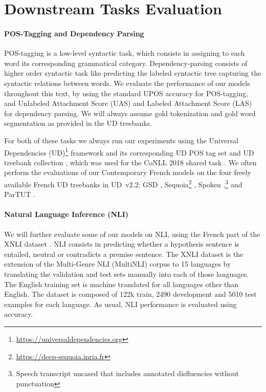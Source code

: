 \section{Downstream Tasks Evaluation}\label{MethodEVAL}

\paragraph{POS-Tagging and Dependency Parsing} POS-tagging is a low-level syntactic task, which consists in assigning to each word its corresponding grammatical category. Dependency-parsing consists of higher order syntactic task like predicting the labeled syntactic tree capturing the syntactic relations between words. We evaluate the performance of our models throughout this text, by using the standard UPOS accuracy for POS-tagging, and Unlabeled Attachment Score (UAS) and Labeled Attachment Score (LAS) for dependency parsing. We will always assume gold tokenization and gold word segmentation as provided in the UD treebanks.

For both of these tasks we always run our experiments using the Universal Dependencies (UD)\footnote{\url{https://universaldependencies.org}} framework and its corresponding UD POS tag set \citep{petrov-etal-2012-universal} and UD treebank collection \citep{nivre-etal-2018-universal}, which was used for the CoNLL 2018 shared task \citep{seker-etal-2018-universal}. We often perform the evaluations of our Contemporary French models on the four freely available French UD treebanks in UD~v2.2: GSD \citep{mcdonald-etal-2013-universal}, Sequoia\footnote{\url{https://deep-sequoia.inria.fr}} \citep{candito-seddah-2012-le,candito-etal-2014-deep}, Spoken \citep{lacheret-etal-2014-rhapsodie,bawden-etal-2014-correcting},\footnote{Speech transcript uncased that includes annotated disfluencies without punctuation} and ParTUT \citep{sanguinetti-Bosco-2015-parttut}.

\paragraph{Natural Language Inference (NLI)} We will further evaluate some of our models on NLI, using the French part of the XNLI dataset \citep{conneau-etal-2018-xnli}. NLI consists in predicting whether a hypothesis sentence is entailed, neutral or contradicts a premise sentence. The XNLI dataset is the extension of the Multi-Genre NLI (MultiNLI) corpus \citep{williams-etal-2018-broad} to 15 languages by translating the validation and test sets manually into each of those languages. The English training set is machine translated for all languages other than English. The dataset is composed of 122k train, 2490 development and 5010 test examples for each language. As usual, NLI performance is evaluated using accuracy.


